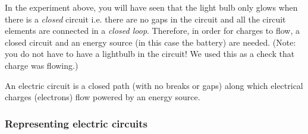         \label{m38771*id62768}In the experiment above, you will have seen that the light bulb only glows when there is a \textsl{closed} circuit i.e. there are no gaps in the circuit and all the circuit elements are connected in a \textsl{closed loop}. Therefore, in order for charges to flow, a closed circuit and an energy source (in this case the battery) are needed. (Note: you do not have to have a lightbulb in the circuit! We used this as a check that charge was flowing.)\par 
\label{m38771*fhsst!!!underscore!!!id128}
 { \label{m38771*meaningfhsst!!!underscore!!!id128}
        \label{m38771*id62792}An electric circuit is a closed path (with no breaks or gaps) along which electrical charges (electrons) flow powered by an energy source. \par 
         } 
   
      \label{m38771*uid10}
            \subsubsection{ Representing electric circuits}
            \nopagebreak
        \label{m38771*uid11}

